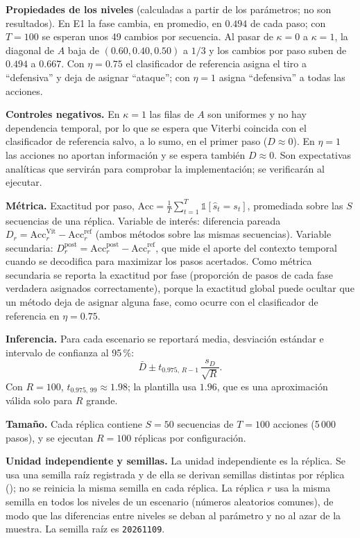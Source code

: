 \documentclass[11pt,a4paper]{article}
\begin{document}
\textbf{Propiedades de los niveles} (calculadas a partir de los parámetros; no
son resultados). En E1 la fase cambia, en promedio, en $0.494$ de cada paso; con
$T=100$ se esperan unos 49 cambios por secuencia. Al pasar de $\kappa=0$ a
$\kappa=1$, la diagonal de $A$ baja de $(0.60,0.40,0.50)$ a $1/3$ y los cambios
por paso suben de $0.494$ a $0.667$. Con $\eta=0.75$ el clasificador de
referencia asigna el tiro a ``defensiva'' y deja de asignar ``ataque''; con
$\eta=1$ asigna ``defensiva'' a todas las acciones.

\textbf{Controles negativos.} En $\kappa=1$ las filas de $A$ son uniformes y no
hay dependencia temporal, por lo que se espera que Viterbi coincida con el
clasificador de referencia salvo, a lo sumo, en el primer paso ($D\approx0$). En
$\eta=1$ las acciones no aportan información y se espera también $D\approx0$.
Son expectativas analíticas que servirán para comprobar la implementación; se
verificarán al ejecutar.

\textbf{Métrica.} Exactitud por paso,
$\mathrm{Acc}=\frac{1}{T}\sum_{t=1}^{T}\mathbb{1}[\hat s_t=s_t]$,
promediada sobre las $S$ secuencias de una réplica. Variable de interés:
diferencia pareada $D_r=\mathrm{Acc}^{\mathrm{Vit}}_r-\mathrm{Acc}^{\mathrm{ref}}_r$
(ambos métodos sobre las mismas secuencias). Variable secundaria:
$D^{\mathrm{post}}_r=\mathrm{Acc}^{\mathrm{post}}_r-\mathrm{Acc}^{\mathrm{ref}}_r$,
que mide el aporte del contexto temporal cuando se decodifica para maximizar
los pasos acertados. Como métrica secundaria se reporta la exactitud por fase (proporción de pasos
de cada fase verdadera asignados correctamente), porque la exactitud global
puede ocultar que un método deja de asignar alguna fase, como ocurre con el
clasificador de referencia en $\eta=0.75$.

\textbf{Inferencia.} Para cada escenario se reportará media, desviación
estándar e intervalo de confianza al 95\,\%:
\begin{equation}
\bar D\pm t_{0.975,\,R-1}\,\frac{s_D}{\sqrt{R}}.
\end{equation}
Con $R=100$, $t_{0.975,\,99}\approx1.98$; la plantilla usa $1.96$, que es una
aproximación válida solo para $R$ grande.

\textbf{Tamaño.} Cada réplica contiene $S=50$ secuencias de $T=100$ acciones
(5\,000 pasos), y se ejecutan $R=100$ réplicas por configuración.

\textbf{Unidad independiente y semillas.} La unidad independiente es la
réplica. Se usa una semilla raíz registrada y de ella se derivan semillas
distintas por réplica (); no se
reinicia la misma semilla en cada réplica. La réplica $r$ usa la misma semilla
en todos los niveles de un escenario (números aleatorios comunes), de modo que
las diferencias entre niveles se deban al parámetro y no al azar de la muestra.
La semilla raíz es \texttt{20261109}.
\end{document}
